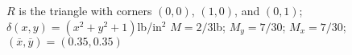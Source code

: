 {$R$ is the triangle with corners $(0,0)$, $(1,0)$, and $(0,1)$; $\delta(x,y) = (x^2+y^2+1)$lb/in$^2$
}
{$M = 2/3$lb; $M_y= 7/30$; $M_x = 7/30$; $(\overline{x},\overline{y}) = (0.35,0.35)$
}